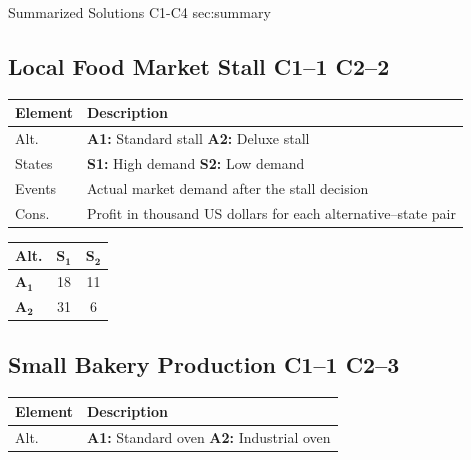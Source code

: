 	\sectionScored
	{Summarized Solutions}
	{C1-C4}
	{sec:summary}
	{
	\subsection{Local Food Market Stall \hfill C1--1 \quad C2--2}
		\begin{center}
			\begin{minipage}[t]{0.6\textwidth}
				\begin{tabularx}{\textwidth}
					{@{}p{1.5cm}>{\raggedright\arraybackslash}X@{}}
					\toprule
					Element & Description \\
					\midrule
					Alt. &
					\textbf{A1:} Standard stall \quad
					\textbf{A2:} Deluxe stall \\
					
					States &
					\textbf{S1:} High demand \quad
					\textbf{S2:} Low demand \\
					
					Events &
					Actual market demand after the stall decision \\
					
					Cons. &
					Profit in thousand US dollars for each alternative--state pair \\
					\bottomrule
				\end{tabularx}
			\end{minipage}
			\hfill
			\begin{minipage}[t]{0.35\textwidth}
				\begin{center}
					\begin{tabular}{lcc}
						\toprule
						Alt. &  \(\mathbf{S_1}\) & \(\mathbf{S_2}\)\\
						\midrule
						\( \mathbf{A_1}\) & 18 & 11\\
						\(\mathbf{A_2}\) & 31 & 6\\
						\bottomrule
					\end{tabular}
				\end{center}
			\end{minipage}
		\end{center}
	
	\subsection{Small Bakery Production \hfill C1--1 \quad C2--3}
	\begin{center}
		\begin{minipage}[t]{0.55\textwidth}
			\begin{tabularx}{\textwidth}{
					@{}p{1.5cm}>{\raggedright\arraybackslash}X@{}
				}
				\toprule
				Element & Description \\
				\midrule
				Alt. &
				\textbf{A1:} Standard oven \quad
				\textbf{A2:} Industrial oven \\
				

\end{tabularx}
\end{minipage}
\end{center}}
